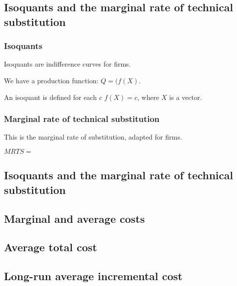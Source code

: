 
\subsection{Isoquants and the marginal rate of technical substitution}

\subsubsection{Isoquants}

Isoquants are indifference curves for firms.

We have a production function: \(Q=(f(X)\).

An isoquant is defined for each \(c\) \(f(X)=c\), where \(X\) is a vector.

\subsubsection{Marginal rate of technical substitution}

This is the marginal rate of substitution, adapted for firms.

\(MRTS=\)


\subsection{Isoquants and the marginal rate of technical substitution}

\subsection{Marginal and average costs}

\subsection{Average total cost}

\subsection{Long-run average incremental cost}

